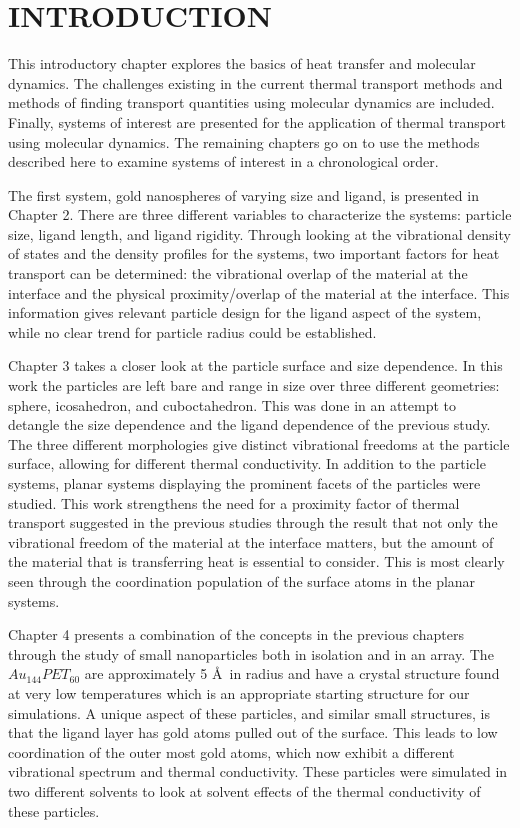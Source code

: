 \chapter{INTRODUCTION}\label{chap:intro}
This introductory chapter explores the basics of heat transfer and molecular dynamics. The challenges existing in the current thermal transport methods and methods of finding transport quantities using molecular dynamics are included. Finally, systems of interest are presented for the application of thermal transport using molecular dynamics. The remaining chapters go on to use the methods described here to examine systems of interest in a chronological order.

The first system, gold nanospheres of varying size and ligand, is presented in Chapter 2.  There are three different variables to characterize the systems: particle size, ligand length, and ligand rigidity. Through looking at the vibrational density of states and the density profiles for the systems, two important factors for heat transport can be determined: the vibrational overlap of the material at the interface and the physical proximity/overlap of the material at the interface. This information gives relevant particle design for the ligand aspect of the system, while no clear trend for particle radius could be established. 

Chapter 3 takes a closer look at the particle surface and size dependence. In this work the particles are left bare and range in size over three different geometries: sphere, icosahedron, and cuboctahedron. This was done in an attempt to detangle the size dependence and the ligand dependence of the previous study. The three different morphologies give  distinct vibrational freedoms at the particle surface, allowing for different thermal conductivity. In addition to the particle systems, planar systems displaying the prominent facets of the particles were studied. This work strengthens the need for a proximity factor of thermal transport suggested in the previous studies through the result that not only the vibrational freedom of the material at the interface matters, but the amount of the material that is transferring heat is essential to consider. This is most clearly seen through the coordination population of the surface atoms in the planar systems.

Chapter 4 presents a combination of the concepts in the previous chapters through the study of small nanoparticles both in isolation and in an array. The $Au_{144}PET_{60}$ are approximately 5 \AA\ in radius and have a crystal structure found at very low temperatures which is an appropriate starting structure for our simulations. A unique aspect of these particles, and similar small structures, is that the ligand layer has gold atoms pulled out of the surface. This leads to low coordination of the outer most gold atoms, which now exhibit a different vibrational spectrum and thermal conductivity. These particles were simulated in two different solvents to look at solvent effects of the thermal conductivity of these particles.

